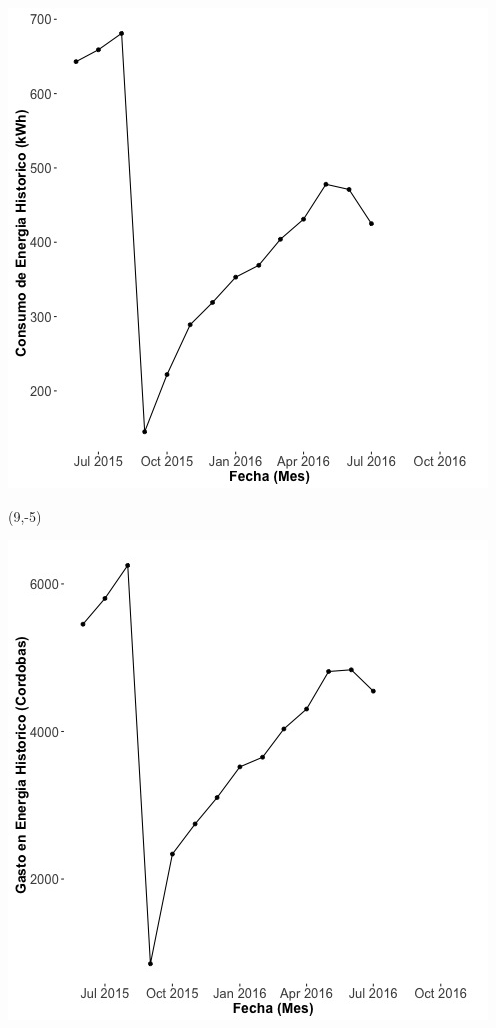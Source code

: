 \documentclass{article}\usepackage[]{graphicx}\usepackage[]{color}
\newenvironment{knitrout}{}{} %
\begin{document}
\begin{knitrout}
\color{fgcolor}
\includegraphics[scale=0.65]{figure/A29_historico_energia} 
\end{knitrout}

 \begin{textblock}{1}(9,-5)
\begin{minipage}{20em}
\begingroup

\endgroup
\end{minipage}
\end{textblock}

\begin{knitrout}
\color{fgcolor}
\includegraphics[scale=0.65]{figure/A29_historico_cordobas} 
\end{knitrout}
\end{document}
